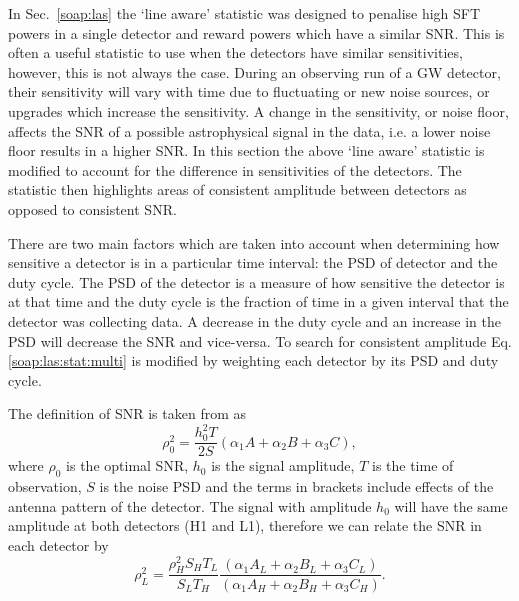 In Sec.~\ref{soap:las} the `line aware' statistic was designed to penalise high
\gls{SFT} powers in a single detector and reward powers which have a similar
\gls{SNR}. This is often a useful statistic to use when the detectors have
similar sensitivities, however, this is not always the case. During an
observing run of a \gls{GW} detector, their sensitivity will vary
with time due to fluctuating or new noise sources, or upgrades which increase the sensitivity. 
A change in the sensitivity, or noise floor,
affects the \gls{SNR} of a possible astrophysical signal in the data, i.e. a lower noise
floor results in a higher \gls{SNR}.  In this section the above `line aware'
statistic is modified to account for the difference in sensitivities of the
detectors.
The statistic then highlights areas of consistent amplitude between detectors as
opposed to consistent \gls{SNR}.

There are two main factors which are taken into account when determining how
sensitive a detector is in a particular time interval: the \gls{PSD} of
detector and the duty cycle. The \gls{PSD} of the detector is a measure of how
sensitive the detector is at that time and the duty cycle is the fraction of
time in a given interval that the detector was collecting data. A decrease in
the duty cycle and an increase in the \gls{PSD} will decrease the \gls{SNR} and
vice-versa. To search for consistent amplitude Eq.\ref{soap:las:stat:multi} is
modified by weighting each detector by its \gls{PSD} and duty cycle.

The definition of \gls{SNR} is taken from \citep{prix2007SearchContinuous} as
\begin{equation}
    \rho_0^2 = \frac{h_0^2 T}{2 S}(\alpha_1A + \alpha_2B + \alpha_3C),
\end{equation}
where $\rho_0$ is the optimal \gls{SNR}, $h_0$ is the signal amplitude, $T$ is
the time of observation, $S$ is the noise \gls{PSD} and the terms in brackets include effects of the antenna pattern of the detector. 
The signal with amplitude $h_0$ will have the same amplitude at both detectors (H1 and L1), therefore we can relate the \gls{SNR} in each detector by
\begin{equation}
\label{lineawareamp:snrequate}
    \rho_L^2 = \frac{\rho_H^2 S_H T_L}{S_L T_H} \frac{(\alpha_1A_L + \alpha_2B_L + \alpha_3C_L)}{(\alpha_1A_H + \alpha_2B_H + \alpha_3C_H)} .
\end{equation}

